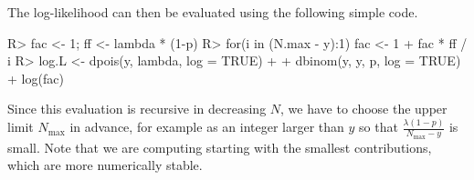 \documentclass[codesnippet]{jss}
\begin{document}
The log-likelihood can then be evaluated using the following simple 
 code.

\begin{CodeInput}
R> fac <- 1; ff <- lambda * (1-p)
R> for(i in (N.max - y):1) fac <- 1 + fac * ff / i
R> log.L <- dpois(y, lambda, log = TRUE) +
+    dbinom(y, y, p, log = TRUE) + log(fac)
\end{CodeInput}

Since this evaluation is recursive in decreasing $N$, we have to choose the upper limit $N_\text{max}$ in advance, for example as an integer larger than $y$ so that $\frac{\lambda (1-p)}{N_\text{max}-y}$ is small. Note that we are computing  starting with the smallest contributions, which are more numerically stable.
	
\end{document}
